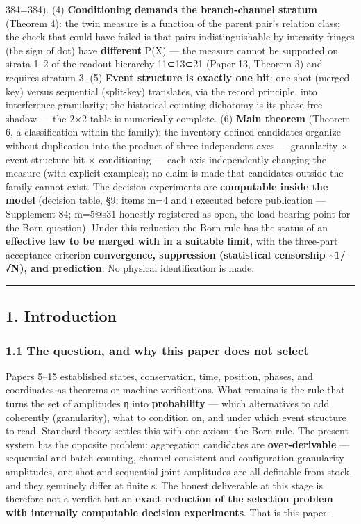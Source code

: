 \documentclass[
]{article}
\begin{document}
384=384). (4) \textbf{Conditioning demands the branch-channel stratum}
(Theorem 4): the twin measure is a function of the parent pair's
relation class; the check that could have failed is that pairs
indistinguishable by intensity fringes (the sign of dot) have
\textbf{different} P(X) --- the measure cannot be supported on strata
1--2 of the readout hierarchy 11⊂13⊂21 (Paper 13, Theorem 3) and
requires stratum 3. (5) \textbf{Event structure is exactly one bit}:
one-shot (merged-key) versus sequential (split-key) translates, via the
record principle, into interference granularity; the historical counting
dichotomy is its phase-free shadow --- the 2×2 table is numerically
complete. (6) \textbf{Main theorem} (Theorem 6, a classification within
the family): the inventory-defined candidates organize without
duplication into the product of three independent axes --- granularity ×
event-structure bit × conditioning --- each axis independently changing
the measure (with explicit examples); no claim is made that candidates
outside the family cannot exist. The decision experiments are
\textbf{computable inside the model} (decision table, §9; items m=4 and
ι executed before publication --- Supplement 84; m=5@s31 honestly
registered as open, the load-bearing point for the Born question). Under
this reduction the Born rule has the status of an \textbf{effective law
to be merged with in a suitable limit}, with the three-part acceptance
criterion \textbf{convergence, suppression (statistical censorship
\textasciitilde1/√N), and prediction}. No physical identification is
made.

\begin{center}\rule{0.5\linewidth}{0.5pt}\end{center}

\subsection{1. Introduction}\label{introduction}

\subsubsection{1.1 The question, and why this paper does not
select}\label{the-question-and-why-this-paper-does-not-select}

Papers 5--15 established states, conservation, time, position, phases,
and coordinates as theorems or machine verifications. What remains is
the rule that turns the set of amplitudes η into \textbf{probability}
--- which alternatives to add coherently (granularity), what to
condition on, and under which event structure to read. Standard theory
settles this with one axiom: the Born rule. The present system has the
opposite problem: aggregation candidates are \textbf{over-derivable} ---
sequential and batch counting, channel-consistent and
configuration-granularity amplitudes, one-shot and sequential joint
amplitudes are all definable from stock, and they genuinely differ at
finite s. The honest deliverable at this stage is therefore not a
verdict but an \textbf{exact reduction of the selection problem with
internally computable decision experiments}. That is this paper.
\end{document}
